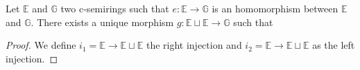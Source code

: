 \begin{theorem}
	Let $\mathbb{E}$ and $\mathbb{G}$ two c-semirings such that $e : \mathbb{E} \rightarrow \mathbb{G} $ is an homomorphism between $ \mathbb{E} $ and $ \mathbb{G} $. There exists a unique morphism $g :  \mathbb{E} \sqcup \mathbb{E} \rightarrow \mathbb{G}$ such that
\end{theorem}

\begin{proof} 
	We define $i_1 = \mathbb{E} \rightarrow \mathbb{E} \sqcup \mathbb{E} $ the right injection and $i_2 = \mathbb{E} \rightarrow \mathbb{E} \sqcup \mathbb{E} $ as the left injection.
\end{proof}
